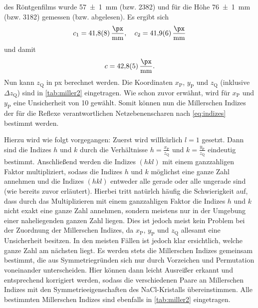 des Röntgenfilms wurde \SI{57(1)}{\milli \meter} (bzw. \SI{2382}{\px}) und für die Höhe \SI{76(1)}{\milli \meter} (bzw. \SI{3182}{\px}) gemessen (bzw. abgelesen).
Es ergibt sich
\begin{equation*}
    c_1 = \SI{41,8(8)}{\frac{\px}{\milli \meter}} , \quad c_2 = \SI{41,9(6)}{\frac{\px}{\milli \meter}}
\end{equation*} und damit
\begin{equation*}
    c = \SI{42,8(5)}{\frac{\px}{\milli \meter}} .
\end{equation*} Nun kann $z_{\mathrm{Q}}$ in px berechnet werden. Die Koordinaten $x_{\mathrm{P}}$, $y_{\mathrm{P}}$ und $z_{\mathrm{Q}}$ (inklusive $\Delta z_{\mathrm{Q}}$) sind in \cref{tab:miller2} eingetragen.
Wie schon zuvor erwähnt, wird für $x_{\mathrm{P}}$ und $y_{\mathrm{P}}$ eine Unsicherheit von \SI{10}{\px} gewählt. Somit können nun die Millerschen Indizes der
für die Reflexe verantwortlichen Netzebenenscharen nach \cref{eq:indizes} bestimmt werden.\par
Hierzu wird wie folgt vorgegangen: Zuerst wird willkürlich $l = 1$ gesetzt. Dann
sind die Indizes $h$ und $k$ durch die Verhältnisse $h = \frac{x_{\mathrm{P}}}{z_{\mathrm{Q}}}$ und $k = \frac{y_{\mathrm{P}}}{z_{\mathrm{Q}}}$ eindeutig bestimmt. Anschließend
werden die Indizes $(hkl)$ mit einem ganzzahligen Faktor multipliziert, sodass die Indizes $h$ und $k$ möglichst eine ganze Zahl annehmen und die Indizes $(hkl)$ entweder
alle gerade oder alle ungerade sind (wie bereits zuvor erläutert). Hierbei tritt natürlch häufig die Schwierigkeit auf, dass durch das Multiplizieren mit einem ganzzahligen Faktor
die Indizes $h$ und $k$ nicht exakt eine ganze Zahl annehmen, sondern meistens nur in der Umgebung einer naheliegenden ganzen Zahl liegen. Dies ist jedoch meist kein Problem bei
der Zuordnung der Millerschen Indizes, da $x_{\mathrm{P}}$, $y_{\mathrm{P}}$ und $z_{\mathrm{Q}}$ allesamt eine Unsicherheit besitzen. In den meisten Fällen ist jedoch klar
ersichtlich, welche ganze Zahl am nächsten liegt. Es werden stets die Millerschen Indizes gemeinsam bestimmt, die aus Symmetriegründen sich nur durch Vorzeichen und Permutation voneinander
unterscheiden. Hier können dann leicht Ausreißer erkannt und entsprechend korrigiert werden, sodass die verschiedenen Paare an Millerschen Indizes mit den Symmetrieeigenschaften
des NaCl-Kristalls übereinstimmen. Alle bestimmten Millerschen Indizes sind ebenfalls in \cref{tab:miller2} eingetragen.\newpage
